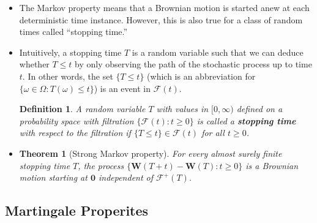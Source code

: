 \documentclass[10pt]{article}
\newtheorem{theorem}[lemma]{Theorem}
\newtheorem{definition}[lemma]{Definition}
\newcommand{\ve}[1]{\mathbf{#1}}
\newcommand{\mcal}[1]{\mathcal{#1}}
\begin{document}
\begin{itemize}
\begin{comment}
  \item The Markov property can be slightly improved. Define
  \begin{align*}
    \mcal{F}^+(s) = \bigcap_{t > s} \mcal{F}^0(t).
  \end{align*}
  Intuitively, it contains all information common to the future of the Brownian motion from time $s$. We have that the family $\{ \mcal{F}^+(t): t \geq 0 \}$ is a filtration. Moreover, $\mcal{F}^0(s) \subseteq \mcal{F}^+(s)$ because $\mcal{F}^+(s)$ has an infinitesimally more information about the future.

  \item \begin{theorem}[Slightly stronger Markov property]
    The process $\{ \ve{W}(t+s) - \ve{W}(s) : t \geq 0 \}$ is independent of the $\sigma$-algebra $\mcal{F}^+(s)$.
  \end{theorem}
\end{comment}

  \item The Markov property means that a Brownian motion is started anew at each deterministic time instance. However, this is also true for a class of random times called ``stopping time.''
  
  \item Intuitively, a stopping time $T$ is a random variable such that we can deduce whether $T \leq t$ by only observing the path of the stochastic process up to time $t$. In other words, the set $\{ T \leq t\}$ (which is an abbreviation for $\{ \omega \in \Omega : T(\omega) \leq t \} $) is an event in $\mcal{F}(t)$.
  
  \begin{definition}
    A random variable $T$ with values in $[0,\infty)$ defined on a probability space with filtration $\{ \mcal{F}(t): t \geq 0 \}$ is called a {\bf stopping time} with respect to the filtration if $\{ T \leq t \} \in \mcal{F}(t)$ for all $t \geq 0$.
  \end{definition}

  \item \begin{theorem}[Strong Markov property]
    For every almost surely finite stopping time $T$, the process $\{ \ve{W}(T+t) - \ve{W}(T) : t \geq 0 \}$ is a Brownian motion starting at $\ve{0}$ independent of $\mcal{F}^+(T)$.
  \end{theorem}
\end{itemize}

\subsection{Martingale Properites}
\end{document}
